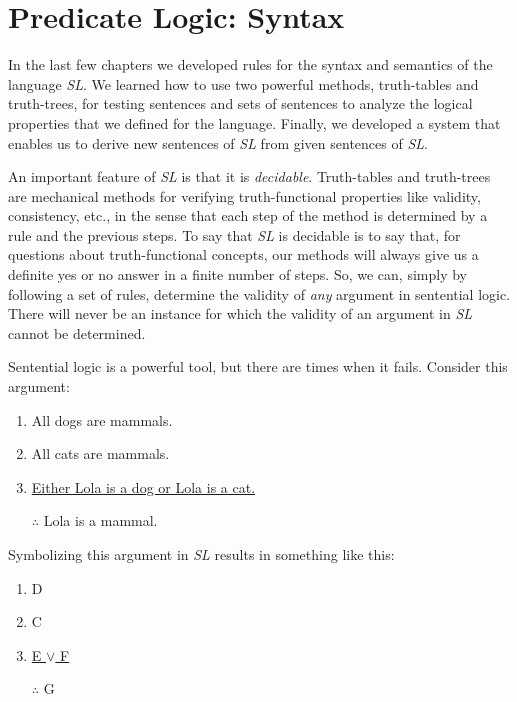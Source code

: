 \documentclass[../logic-text.tex]{subfiles}
\begin{document}
\chapter{Predicate Logic: Syntax}
\label{cha:pl-syntax}



In the last few chapters we developed rules for the syntax and semantics of the language \emph{SL}.
We learned how to use two powerful methods, truth-tables and truth-trees, for testing sentences and sets of sentences to analyze the logical properties that we defined for the language.
Finally, we developed a system that enables us to derive new sentences of \emph{SL} from given sentences of \emph{SL}.

An important feature of \emph{SL} is that it is \emph{decidable}.
Truth-tables and truth-trees are mechanical methods for verifying truth-functional properties like validity, consistency, etc., in the sense that each step of the method is determined by a rule and the previous steps.
To say that \emph{SL} is decidable is to say that, for questions about truth-functional concepts, our methods will always give us a definite yes or no answer in a finite number of steps.
So, we can, simply by following a set of rules, determine the validity of \emph{any} argument in sentential logic. There will never be an instance for which the validity of an argument in \emph{SL} cannot be determined.

Sentential logic is a powerful tool, but there are times when it fails.
Consider this argument:

\begin{enumerate}
  \item All dogs are mammals.
  \item All cats are mammals.
  \item \underline{Either Lola is a dog or Lola is a cat.}
  \item [$\therefore$] Lola is a mammal.
\end{enumerate}


\noindent Symbolizing this argument in \emph{SL} results in something like this:

\begin{enumerate}
  \item D
  \item C
  \item \underline{E \(\lor\) F}
  \item [$\therefore$] G
\end{enumerate}
\end{document}
